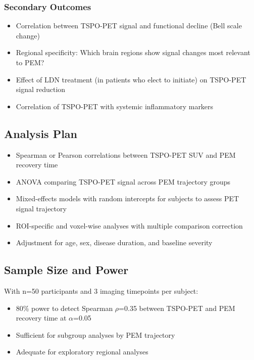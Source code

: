 \subsubsection{Secondary Outcomes}
\begin{itemize}
    \item Correlation between TSPO-PET signal and functional decline (Bell scale change)
    \item Regional specificity: Which brain regions show signal changes most relevant to PEM?
    \item Effect of LDN treatment (in patients who elect to initiate) on TSPO-PET signal reduction
    \item Correlation of TSPO-PET with systemic inflammatory markers
\end{itemize}

\subsection{Analysis Plan}

\begin{itemize}
    \item Spearman or Pearson correlations between TSPO-PET SUV and PEM recovery time
    \item ANOVA comparing TSPO-PET signal across PEM trajectory groups
    \item Mixed-effects models with random intercepts for subjects to assess PET signal trajectory
    \item ROI-specific and voxel-wise analyses with multiple comparison correction
    \item Adjustment for age, sex, disease duration, and baseline severity
\end{itemize}

\subsection{Sample Size and Power}

With n=50 participants and 3 imaging timepoints per subject:
\begin{itemize}
    \item 80\% power to detect Spearman $\rho$=0.35 between TSPO-PET and PEM recovery time at $\alpha$=0.05
    \item Sufficient for subgroup analyses by PEM trajectory
    \item Adequate for exploratory regional analyses
\end{itemize}

